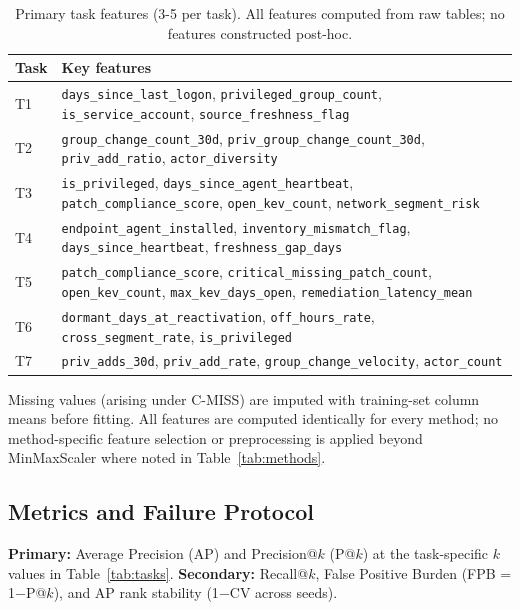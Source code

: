 \documentclass[conference]{IEEEtran}
\begin{document}
\begin{table}[t]
\centering
\caption{Primary task features (3-5 per task). All features computed from raw
  tables; no features constructed post-hoc.}
\label{tab:features}
\scriptsize
\begin{tabular}{@{} l >{\raggedright\arraybackslash}p{5.8cm} @{}}
\toprule
Task & Key features \\
\midrule
T1 & \texttt{days\_since\_last\_logon}, \texttt{privileged\_group\_count},
     \texttt{is\_service\_account}, \texttt{source\_freshness\_flag} \\
T2 & \texttt{group\_change\_count\_30d}, \texttt{priv\_group\_change\_count\_30d},
     \texttt{priv\_add\_ratio}, \texttt{actor\_diversity} \\
T3 & \texttt{is\_privileged}, \texttt{days\_since\_agent\_heartbeat},
     \texttt{patch\_compliance\_score}, \texttt{open\_kev\_count},
     \texttt{network\_segment\_risk} \\
T4 & \texttt{endpoint\_agent\_installed}, \texttt{inventory\_mismatch\_flag},
     \texttt{days\_since\_heartbeat}, \texttt{freshness\_gap\_days} \\
T5 & \texttt{patch\_compliance\_score}, \texttt{critical\_missing\_patch\_count},
     \texttt{open\_kev\_count}, \texttt{max\_kev\_days\_open},
     \texttt{remediation\_latency\_mean} \\
T6 & \texttt{dormant\_days\_at\_reactivation}, \texttt{off\_hours\_rate},
     \texttt{cross\_segment\_rate}, \texttt{is\_privileged} \\
T7 & \texttt{priv\_adds\_30d}, \texttt{priv\_add\_rate},
     \texttt{group\_change\_velocity}, \texttt{actor\_count} \\
\bottomrule
\end{tabular}
\end{table}

Missing values (arising under C-MISS) are imputed with training-set column means
before fitting. All features are computed identically for every method; no
method-specific feature selection or preprocessing is applied beyond MinMaxScaler
where noted in Table~\ref{tab:methods}.

\subsection{Metrics and Failure Protocol}

\textbf{Primary:} Average Precision (AP) and Precision@$k$ (P@$k$) at the
task-specific $k$ values in Table~\ref{tab:tasks}. \textbf{Secondary:} Recall@$k$,
False Positive Burden (FPB = 1$-$P@$k$), and AP rank stability (1$-$CV across
seeds).
\end{document}
